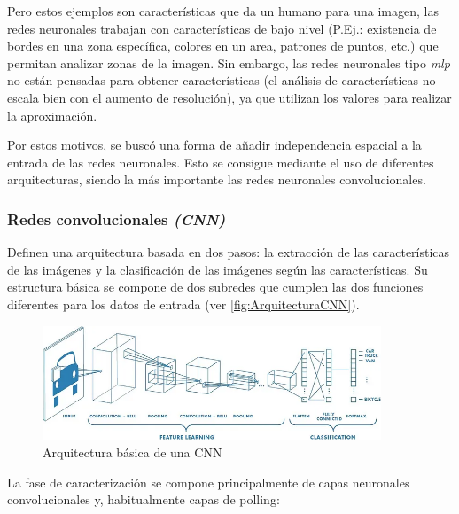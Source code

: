 Pero estos ejemplos son características que da un humano para una imagen, las redes neuronales trabajan con características de bajo nivel (P.Ej.: existencia de bordes en una zona específica, colores en un area, 
patrones de puntos, etc.) que permitan analizar zonas de la imagen. Sin embargo, las redes neuronales tipo \textit{\acrshort{mlp}} no están pensadas para obtener características (el análisis de características 
no escala bien con el aumento de resolución), ya que utilizan los valores para realizar la aproximación.

Por estos motivos, se buscó una forma de añadir independencia espacial a la entrada de las redes neuronales. Esto se consigue mediante el uso de diferentes arquitecturas, siendo la más importante las redes 
neuronales convolucionales.\newline

\subsubsection{Redes convolucionales \textit{(CNN)}}

Definen una arquitectura basada en dos pasos: la extracción de las características de las imágenes y la clasificación de las imágenes según las características. Su estructura básica se compone de dos subredes 
que cumplen las dos funciones diferentes para los datos de entrada (ver \autoref{fig:ArquitecturaCNN}).

\begin{figure}[H]
    \centering
    \includegraphics[width=0.9\textwidth]{images/4/ArquitecturaCNN.png}
    \caption{Arquitectura básica de una CNN\cite{sahaComprehensiveGuideConvolutional2022}}
    \label{fig:ArquitecturaCNN}
\end{figure}

\clearpage

La fase de caracterización se compone principalmente de capas neuronales convolucionales y, habitualmente capas de polling:

